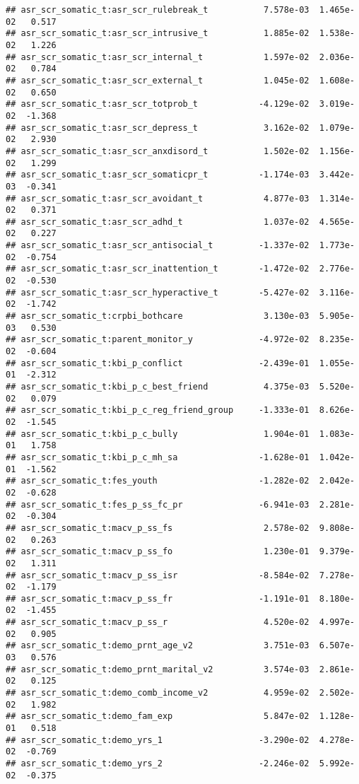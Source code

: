\documentclass[
]{article}
\begin{document}
\begin{verbatim}
## asr_scr_somatic_t:asr_scr_rulebreak_t           7.578e-03  1.465e-02   0.517
## asr_scr_somatic_t:asr_scr_intrusive_t           1.885e-02  1.538e-02   1.226
## asr_scr_somatic_t:asr_scr_internal_t            1.597e-02  2.036e-02   0.784
## asr_scr_somatic_t:asr_scr_external_t            1.045e-02  1.608e-02   0.650
## asr_scr_somatic_t:asr_scr_totprob_t            -4.129e-02  3.019e-02  -1.368
## asr_scr_somatic_t:asr_scr_depress_t             3.162e-02  1.079e-02   2.930
## asr_scr_somatic_t:asr_scr_anxdisord_t           1.502e-02  1.156e-02   1.299
## asr_scr_somatic_t:asr_scr_somaticpr_t          -1.174e-03  3.442e-03  -0.341
## asr_scr_somatic_t:asr_scr_avoidant_t            4.877e-03  1.314e-02   0.371
## asr_scr_somatic_t:asr_scr_adhd_t                1.037e-02  4.565e-02   0.227
## asr_scr_somatic_t:asr_scr_antisocial_t         -1.337e-02  1.773e-02  -0.754
## asr_scr_somatic_t:asr_scr_inattention_t        -1.472e-02  2.776e-02  -0.530
## asr_scr_somatic_t:asr_scr_hyperactive_t        -5.427e-02  3.116e-02  -1.742
## asr_scr_somatic_t:crpbi_bothcare                3.130e-03  5.905e-03   0.530
## asr_scr_somatic_t:parent_monitor_y             -4.972e-02  8.235e-02  -0.604
## asr_scr_somatic_t:kbi_p_conflict               -2.439e-01  1.055e-01  -2.312
## asr_scr_somatic_t:kbi_p_c_best_friend           4.375e-03  5.520e-02   0.079
## asr_scr_somatic_t:kbi_p_c_reg_friend_group     -1.333e-01  8.626e-02  -1.545
## asr_scr_somatic_t:kbi_p_c_bully                 1.904e-01  1.083e-01   1.758
## asr_scr_somatic_t:kbi_p_c_mh_sa                -1.628e-01  1.042e-01  -1.562
## asr_scr_somatic_t:fes_youth                    -1.282e-02  2.042e-02  -0.628
## asr_scr_somatic_t:fes_p_ss_fc_pr               -6.941e-03  2.281e-02  -0.304
## asr_scr_somatic_t:macv_p_ss_fs                  2.578e-02  9.808e-02   0.263
## asr_scr_somatic_t:macv_p_ss_fo                  1.230e-01  9.379e-02   1.311
## asr_scr_somatic_t:macv_p_ss_isr                -8.584e-02  7.278e-02  -1.179
## asr_scr_somatic_t:macv_p_ss_fr                 -1.191e-01  8.180e-02  -1.455
## asr_scr_somatic_t:macv_p_ss_r                   4.520e-02  4.997e-02   0.905
## asr_scr_somatic_t:demo_prnt_age_v2              3.751e-03  6.507e-03   0.576
## asr_scr_somatic_t:demo_prnt_marital_v2          3.574e-03  2.861e-02   0.125
## asr_scr_somatic_t:demo_comb_income_v2           4.959e-02  2.502e-02   1.982
## asr_scr_somatic_t:demo_fam_exp                  5.847e-02  1.128e-01   0.518
## asr_scr_somatic_t:demo_yrs_1                   -3.290e-02  4.278e-02  -0.769
## asr_scr_somatic_t:demo_yrs_2                   -2.246e-02  5.992e-02  -0.375

\end{verbatim}
\end{document}
